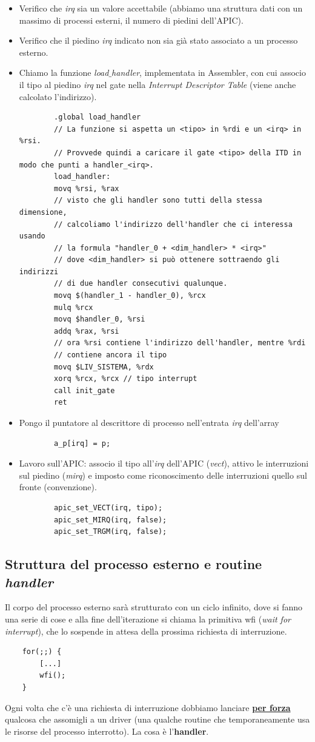\begin{itemize}
	\item Verifico che \emph{irq} sia un valore accettabile (abbiamo una struttura dati con un massimo di processi esterni, il numero di piedini dell'APIC).
	\item Verifico che il piedino \emph{irq} indicato non sia già stato associato a un processo esterno.
	\item Chiamo la funzione \emph{load$\_$handler}, implementata in Assembler, con cui associo il tipo al piedino \emph{irq} nel gate nella \emph{Interrupt Descriptor Table} (viene anche calcolato l'indirizzo).
	\small
	\begin{verbatim}
		.global load_handler
		// La funzione si aspetta un <tipo> in %rdi e un <irq> in %rsi.
		// Provvede quindi a caricare il gate <tipo> della ITD in modo che punti a handler_<irq>.
		load_handler:
		movq %rsi, %rax
		// visto che gli handler sono tutti della stessa dimensione,
		// calcoliamo l'indirizzo dell'handler che ci interessa usando
		// la formula "handler_0 + <dim_handler> * <irq>" 
		// dove <dim_handler> si può ottenere sottraendo gli indirizzi
		// di due handler consecutivi qualunque.
		movq $(handler_1 - handler_0), %rcx
		mulq %rcx
		movq $handler_0, %rsi
		addq %rax, %rsi
		// ora %rsi contiene l'indirizzo dell'handler, mentre %rdi
		// contiene ancora il tipo
		movq $LIV_SISTEMA, %rdx
		xorq %rcx, %rcx	// tipo interrupt
		call init_gate
		ret
	\end{verbatim}
	\normalsize
	\item Pongo il puntatore al descrittore di processo nell'entrata \emph{irq} dell'array
	\begin{verbatim}
		a_p[irq] = p;
	\end{verbatim}
	\item Lavoro sull'APIC: associo il tipo all'\emph{irq} dell'APIC (\emph{vect}), attivo le interruzioni sul piedino (\emph{mirq}) e imposto come riconoscimento delle interruzioni quello sul fronte (convenzione).
	\begin{verbatim}
		apic_set_VECT(irq, tipo);
		apic_set_MIRQ(irq, false);
		apic_set_TRGM(irq, false); 
	\end{verbatim}
\end{itemize}
\subsection{Struttura del processo esterno e routine \emph{handler}} Il corpo del processo esterno sarà strutturato con un ciclo infinito, dove si fanno una serie di cose e alla fine dell'iterazione si chiama la primitiva wfi (\emph{wait for interrupt}), che lo sospende in attesa della prossima richiesta di interruzione. 
\begin{verbatim}
	for(;;) {
		[...]
		wfi();
	}
\end{verbatim}
Ogni volta che c'è una richiesta di interruzione dobbiamo lanciare \textbf{\underline{per forza}} qualcosa che assomigli a un driver (una qualche routine che temporaneamente usa le risorse del processo interrotto). La cosa è l'\textbf{handler}. 

